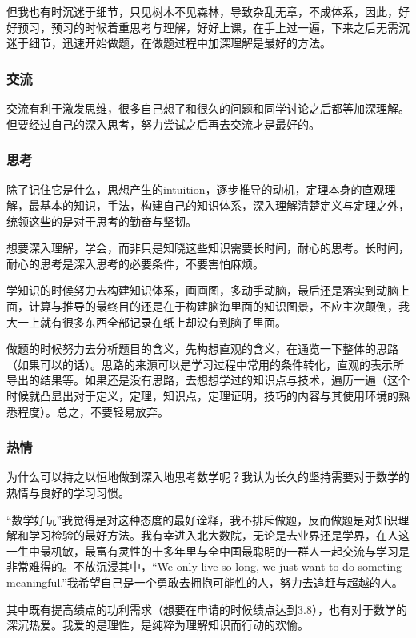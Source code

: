 \documentclass[12pt, a4paper, oneside]{ctexart}
\begin{document}
但我也有时沉迷于细节，只见树木不见森林，导致杂乱无章，不成体系，因此，好好预习，预习的时候着重思考与理解，好好上课，在手上过一遍，下来之后无需沉迷于细节，迅速开始做题，在做题过程中加深理解是最好的方法。

\subsubsection{交流}
交流有利于激发思维，很多自己想了和很久的问题和同学讨论之后都等加深理解。但要经过自己的深入思考，努力尝试之后再去交流才是最好的。

\subsubsection{思考}

除了记住它是什么，思想产生的intuition，逐步推导的动机，定理本身的直观理解，最基本的知识，手法，构建自己的知识体系，深入理解清楚定义与定理之外，统领这些的是对于思考的勤奋与坚韧。

想要深入理解，学会，而非只是知晓这些知识需要长时间，耐心的思考。长时间，耐心的思考是深入思考的必要条件，不要害怕麻烦。

学知识的时候努力去构建知识体系，画画图，多动手动脑，最后还是落实到动脑上面，计算与推导的最终目的还是在于构建脑海里面的知识图景，不应主次颠倒，我大一上就有很多东西全部记录在纸上却没有到脑子里面。

做题的时候努力去分析题目的含义，先构想直观的含义，在通览一下整体的思路（如果可以的话）。思路的来源可以是学习过程中常用的条件转化，直观的表示所导出的结果等。如果还是没有思路，去想想学过的知识点与技术，遍历一遍（这个时候就凸显出对于定义，定理，知识点，定理证明，技巧的内容与其使用环境的熟悉程度）。总之，不要轻易放弃。

\subsubsection{热情}

为什么可以持之以恒地做到深入地思考数学呢？我认为长久的坚持需要对于数学的热情与良好的学习习惯。

“数学好玩”我觉得是对这种态度的最好诠释，我不排斥做题，反而做题是对知识理解和学习检验的最好方法。我有幸进入北大数院，无论是去业界还是学界，在人这一生中最机敏，最富有灵性的十多年里与全中国最聪明的一群人一起交流与学习是非常难得的。不放沉浸其中，“We only live so long, we just want to do someting meaningful.”我希望自己是一个勇敢去拥抱可能性的人，努力去追赶与超越的人。

其中既有提高绩点的功利需求（想要在申请的时候绩点达到3.8），也有对于数学的深沉热爱。我爱的是理性，是纯粹为理解知识而行动的欢愉。
\end{document}
